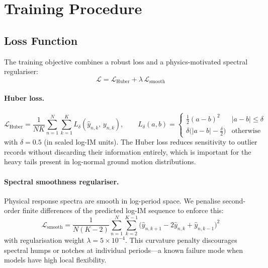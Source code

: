 \documentclass[12pt,a4paper]{article}
\begin{document}
\section{Training Procedure}
\label{sec:training}

\subsection{Loss Function}

The training objective combines a robust loss and a physics-motivated
spectral regulariser:
\begin{equation}
  \mathcal{L} = \mathcal{L}_{\mathrm{Huber}} + \lambda\,\mathcal{L}_{\mathrm{smooth}}
  \label{eq:loss}
\end{equation}

\paragraph{Huber loss.}
\begin{equation}
  \mathcal{L}_{\mathrm{Huber}} = \frac{1}{NK}\sum_{n=1}^{N}\sum_{k=1}^{K}
  L_\delta(\hat{y}_{n,k},\, y_{n,k}), \qquad
  L_\delta(a,b) =
  \begin{cases}
    \tfrac{1}{2}(a-b)^2 & |a-b| \le \delta \\
    \delta\bigl(|a-b| - \tfrac{\delta}{2}\bigr) & \text{otherwise}
  \end{cases}
  \label{eq:huber}
\end{equation}
with $\delta = 0.5$ (in scaled log-IM units).
The Huber loss reduces sensitivity to outlier records without discarding their
information entirely, which is important for the heavy tails present in
log-normal ground motion distributions.

\paragraph{Spectral smoothness regulariser.}
Physical response spectra are smooth in log-period space.
We penalise second-order finite differences of the predicted log-IM sequence
to enforce this:
\begin{equation}
  \mathcal{L}_{\mathrm{smooth}} = \frac{1}{N(K{-}2)}\sum_{n=1}^{N}
  \sum_{k=2}^{K-1}
  \bigl(\hat{y}_{n,k+1} - 2\hat{y}_{n,k} + \hat{y}_{n,k-1}\bigr)^2
  \label{eq:smooth}
\end{equation}
with regularisation weight $\lambda = 5 \times 10^{-4}$.
This curvature penalty discourages spectral humps or notches at individual
periods---a known failure mode when models have high local flexibility.
\end{document}

